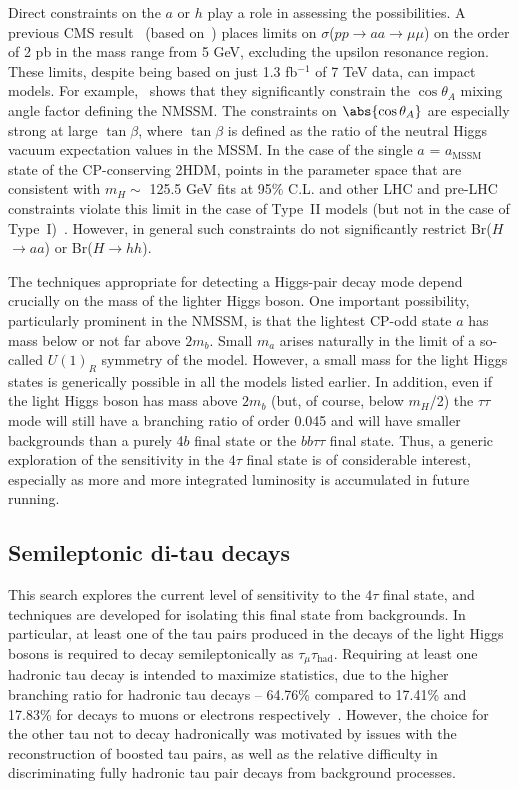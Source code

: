 Direct constraints on the $a$ or $h$ play a role in assessing the possibilities. A previous CMS result~\cite{Chatrchyan:2012am} (based on~\cite{Dermisek:2009fd}) places limits on $\sigma$($pp$$\rightarrow$$aa$$\rightarrow$$\mu\mu$) on the order of 2 pb in the mass range from 5 GeV, excluding the upsilon resonance region. These limits, despite being based on just 1.3 fb$^{-1}$ of 7 TeV data, can impact models. For example,~\cite{Chatrchyan:2012am} shows that they significantly constrain the $\cos\theta_A$ mixing angle factor defining the NMSSM.  The constraints on $\abs{\cos\theta_A}$ are especially strong at large $\tan\beta$, where $\tan\beta$ is defined as the ratio of the neutral Higgs vacuum expectation values in the MSSM. In the case of the single $a$ = $a_{\text{MSSM}}$ state of the CP-conserving 2HDM, points in the parameter space that are consistent with $m_H \sim$ 125.5 GeV fits at 95\% C.L. and other LHC and pre-LHC constraints violate this limit in the case of Type~II models (but not in the case of Type~I)~\cite{Dumont:2014wha}.  However, in general such constraints do not significantly restrict Br($H$$\rightarrow$$aa$) or Br($H$$\rightarrow$$hh$).  

The techniques appropriate for detecting a Higgs-pair decay mode depend crucially on the mass of the lighter Higgs boson. One important possibility, particularly prominent in the NMSSM, is that the lightest CP-odd state $a$ has mass below or not far above $2m_b$. Small $m_a$ arises naturally in the limit of a so-called $U(1)_R$ symmetry of the model. However, a small mass for the light Higgs states is generically possible in all the models listed earlier. In addition, even if the light Higgs boson has mass above $2m_b$ (but, of course, below $m_H$/2) the $\tau\tau$ mode will still have a branching ratio of order 0.045 and will have smaller backgrounds than a purely 4$b$ final state or the $bb\tau\tau$ final state. Thus, a generic exploration of the sensitivity in the $4\tau$ final state is of considerable interest, especially as more and more integrated luminosity is accumulated in future running.

\subsection{Semileptonic di-tau decays\label{sec:semileptonic}}

This search explores the current level of sensitivity to the $4\tau$ final state, and techniques are developed for isolating this final state from backgrounds. In particular, at least one of the tau pairs produced in the decays of the light Higgs bosons is required to decay semileptonically as $\tau_{\mu}\tau_{\text{had}}$. Requiring at least one hadronic tau decay is intended to maximize statistics, due to the higher branching ratio for hadronic tau decays -- 64.76\% compared to 17.41\% and 17.83\% for decays to muons or electrons respectively~\cite{Agashe:2014kda}. However, the choice for the other tau not to decay hadronically was motivated by issues with the reconstruction of boosted tau pairs, as well as the relative difficulty in discriminating fully hadronic tau pair decays from background processes.

